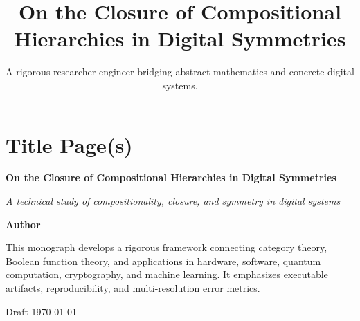 \documentclass[11pt]{article}
\title{On the Closure of Compositional Hierarchies in Digital Symmetries}
\author{A rigorous researcher-engineer bridging abstract mathematics and concrete digital systems.}
\begin{document}
\maketitle

\tableofcontents

\clearpage

\section{Title Page(s)}


\thispagestyle{empty}
\begin{titlepage}
\centering
\vspace*{0.12\textheight}

{\Huge\bfseries On the Closure of Compositional Hierarchies in Digital Symmetries\par}
\vspace{1.15em}

{\Large\itshape A technical study of compositionality, closure, and symmetry in digital systems\par}
\vspace{2.0em}

{\large\textbf{Author}\par}
\vfill

\begin{minipage}{0.84\textwidth}
\centering
This monograph develops a rigorous framework connecting category theory, Boolean function theory,
and applications in hardware, software, quantum computation, cryptography, and machine learning.
It emphasizes executable artifacts, reproducibility, and multi-resolution error metrics.
\end{minipage}

\vfill

{\large Draft \;\textbullet\; \today\par}
\vspace*{0.08\textheight}
\end{titlepage}
\end{document}
